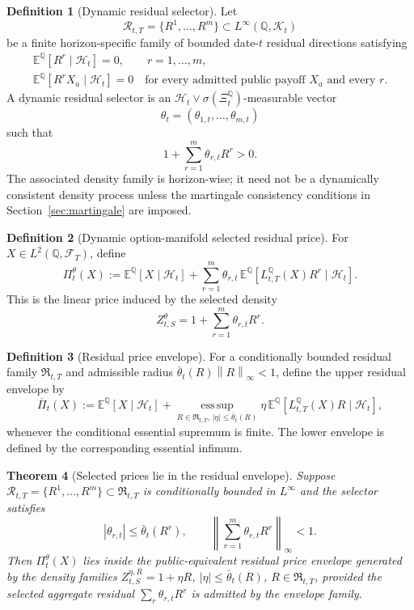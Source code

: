 \documentclass[11pt,a4paper]{amsart}
\theoremstyle{plain}
\newtheorem{theorem}{Theorem}[section]
\theoremstyle{definition}
\newtheorem{definition}[theorem]{Definition}
\theoremstyle{remark}
\newcommand{\QQ}{\mathbb{Q}}
\newcommand{\EE}{\mathbb{E}}
\newcommand{\cF}{\mathcal{F}}
\newcommand{\cH}{\mathcal{H}}
\newcommand{\cK}{\mathcal{K}}
\newcommand{\cR}{\mathcal{R}}
\newcommand{\norm}[1]{\left\lVert #1\right\rVert}
\begin{document}
\begin{definition}[Dynamic residual selector]\label{def:residual-selector}
Let
\[
        \cR_{t,T}=\{R^1,\dots,R^m\}\subset L^\infty(\QQ,\cK_t)
\]
be a finite horizon-specific family of bounded date-\(t\) residual directions satisfying
\begin{gather*}
        \EE^\QQ[R^r\mid\cH_t]=0,
        \qquad r=1,\dots,m,\\
        \EE^\QQ[R^rX_a\mid\cH_t]=0
        \quad\text{for every admitted public payoff }X_a
        \text{ and every }r.
\end{gather*}
A dynamic residual selector is an \(\cH_t\vee\sigma(\Xi_t^\QQ)\)-measurable vector
\[
        \theta_t=(\theta_{1,t},\dots,\theta_{m,t})
\]
such that
\[
        1+\sum_{r=1}^m\theta_{r,t}R^r>0 .
\]
The associated density family is horizon-wise; it need not be a dynamically consistent density
process unless the martingale consistency conditions in Section~\ref{sec:martingale} are imposed.
\end{definition}

\begin{definition}[Dynamic option-manifold selected residual price]\label{def:dynamic-selected-price}
For \(X\in L^2(\QQ,\cF_T)\), define
\[
        \Pi_t^\theta(X)
        :=
        \EE^\QQ[X\mid\cH_t]
        +
        \sum_{r=1}^m
        \theta_{r,t}\,
        \EE^\QQ[L_{t,T}^\QQ(X)R^r\mid\cH_t].
\]
This is the linear price induced by the selected density
\[
        Z_{t,S}^{\theta}=1+\sum_{r=1}^m\theta_{r,t}R^r .
\]
\end{definition}

\begin{definition}[Residual price envelope]\label{def:residual-envelope}
For a conditionally bounded residual family \(\mathfrak R_{t,T}\) and admissible radius
\(\bar\theta_t(R)\norm{R}_\infty<1\), define the upper residual envelope by
\[
        \overline\Pi_t(X)
        :=
        \EE^\QQ[X\mid\cH_t]
        +
        \operatorname*{ess\,sup}_{R\in\mathfrak R_{t,T},\,|\eta|\le\bar\theta_t(R)}
        \eta\,\EE^\QQ[L_{t,T}^\QQ(X)R\mid\cH_t],
\]
whenever the conditional essential supremum is finite.  The lower envelope is defined by the
corresponding essential infimum.
\end{definition}

\begin{theorem}[Selected prices lie in the residual envelope]\label{thm:selected-envelope}
Suppose \(\cR_{t,T}=\{R^1,\dots,R^m\}\subset\mathfrak R_{t,T}\) is conditionally bounded in
\(L^\infty\) and the selector satisfies
\[
        |\theta_{r,t}|\le\bar\theta_t(R^r),
        \qquad
        \left\|\sum_{r=1}^m\theta_{r,t}R^r\right\|_\infty<1.
\]
Then \(\Pi_t^\theta(X)\) lies inside the public-equivalent residual price envelope generated by
the density families \(Z_{t,S}^{\eta,R}=1+\eta R\), \(|\eta|\le\bar\theta_t(R)\),
\(R\in\mathfrak R_{t,T}\), provided the selected aggregate residual
\(\sum_r\theta_{r,t}R^r\) is admitted by the envelope family.
\end{theorem}
\end{document}
